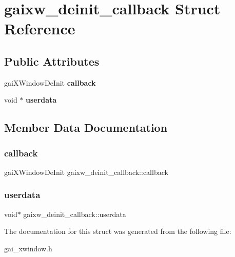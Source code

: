 \hypertarget{structgaixw__deinit__callback}{}\section{gaixw\+\_\+deinit\+\_\+callback Struct Reference}
\label{structgaixw__deinit__callback}
\subsection*{Public Attributes}
\begin{DoxyCompactItemize}
\item 
\mbox{\label{structgaixw__deinit__callback_aedb956c0741ac46bed72b3d7c4f8b21b}} 
gai\+X\+Window\+De\+Init {\bfseries callback}
\item 
\mbox{\label{structgaixw__deinit__callback_abf3a170136b6de8e2d14a83df3c09446}} 
void $\ast$ {\bfseries userdata}
\end{DoxyCompactItemize}


\subsection{Member Data Documentation}
\mbox{\label{structgaixw__deinit__callback_aedb956c0741ac46bed72b3d7c4f8b21b}} 
\subsubsection{\texorpdfstring{callback}{callback}}
{\footnotesize\ttfamily gai\+X\+Window\+De\+Init gaixw\+\_\+deinit\+\_\+callback\+::callback}

\mbox{\label{structgaixw__deinit__callback_abf3a170136b6de8e2d14a83df3c09446}} 
\subsubsection{\texorpdfstring{userdata}{userdata}}
{\footnotesize\ttfamily void$\ast$ gaixw\+\_\+deinit\+\_\+callback\+::userdata}



The documentation for this struct was generated from the following file\+:\begin{DoxyCompactItemize}
\item 
gai\+\_\+xwindow.\+h\end{DoxyCompactItemize}
